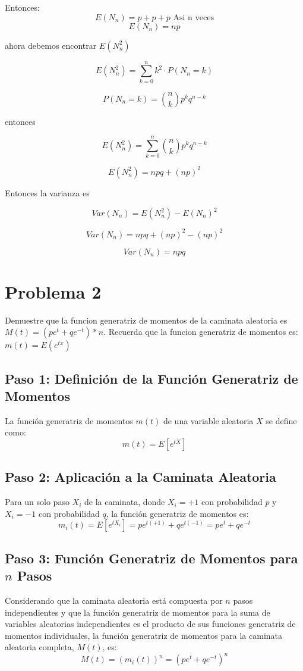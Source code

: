 \documentclass{article}
\begin{document}
Entonces:
\[ E(N_n) = p + p + p \text{ Asi n veces}\]
\[ E(N_n) = np\]

ahora debemos encontrar $E(N_n^2)$

\[E(N_n^2) = \sum_{k=0}^{n} k^2 \cdot P(N_n = k)\]

\[P(N_n = k) = \binom{n}{k} p^k q^{n-k}\]

entonces

\[E(N_n^2) = \sum_{k=0}^{n} \binom{n}{k} p^k q^{n-k}\]

\[E(N_n^2) = npq + (np)^2\]

Entonces la varianza es

\[Var(N_n) = E(N_n^2) - E(N_n)^2\]

\[Var(N_n) = npq + (np)^2 - (np)^2\]

\[Var(N_n) = npq\]

\section{Problema 2}

Demuestre que la funcion generatriz de momentos de la caminata aleatoria es $M(t) = (pe^t + qe^{-t}) * n$. Recuerda que la funcion generatriz de momentos es: $m(t) = E(e^{tx})$


\subsection*{Paso 1: Definición de la Función Generatriz de Momentos}
La función generatriz de momentos $m(t)$ de una variable aleatoria $X$ se define como:
\[ m(t) = E[e^{tX}] \]

\subsection*{Paso 2: Aplicación a la Caminata Aleatoria}
Para un solo paso $X_i$ de la caminata, donde $X_i = +1$ con probabilidad $p$ y $X_i = -1$ con probabilidad $q$, la función generatriz de momentos es:
\[ m_i(t) = E[e^{tX_i}] = pe^{t(+1)} + qe^{t(-1)} = pe^t + qe^{-t} \]

\subsection*{Paso 3: Función Generatriz de Momentos para $n$ Pasos}
Considerando que la caminata aleatoria está compuesta por $n$ pasos independientes y que la función generatriz de momentos para la suma de variables aleatorias independientes es el producto de sus funciones generatriz de momentos individuales, la función generatriz de momentos para la caminata aleatoria completa, $M(t)$, es:
\[ M(t) = (m_i(t))^n = (pe^t + qe^{-t})^n \]
\end{document}
